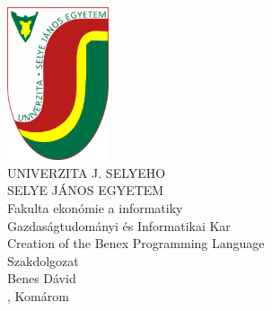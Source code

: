 \documentclass[a4paper,oneside,onecolumn,12pt]{LegrandOrangeBook}
\begin{document}
\thispagestyle{empty}
\begin{minipage}[c][\textheight][c]{\textwidth}
    {
        \centering
        \includegraphics[keepaspectratio,width=3cm]{SelyeBanner.png} \\
        \vskip0.5cm
        {\LARGE UNIVERZITA J. SELYEHO} \\
        \vskip0.5cm
        {\LARGE SELYE JÁNOS EGYETEM} \\
        \vskip0.5cm
        {\large Fakulta ekonómie a informatiky} \\
        \vskip0.5cm
        {\large Gazdaságtudományi és Informatikai Kar} \\
        \vfill
        {\Huge Creation of the Benex Programming Language} \\
        Szakdolgozat \\
        Benes Dávid \\
        \hfill\the\year{}, Komárom\hfill
    }
\end{minipage}
\cleardoublepage
\end{document}
